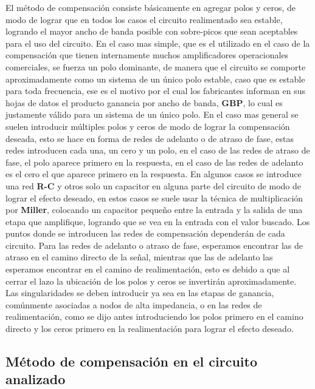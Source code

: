 El método de compensación consiste básicamente en agregar polos y ceros, de modo de lograr que en todos los casos el circuito realimentado sea estable, logrando el mayor ancho de banda posible con sobre-picos que sean aceptables para el uso del circuito. En el caso mas simple, que es el utilizado en el caso de la compensación que tienen internamente muchos amplificadores operacionales comerciales, se fuerza un polo dominante, de manera que el circuito se comporte aproximadamente como un sistema de un único polo estable, caso que es estable para toda frecuencia, ese es el motivo por el cual los fabricantes informan en sus hojas de datos el producto ganancia por ancho de banda, \textbf{GBP}, lo cual es justamente válido para un sistema de un único polo. En el caso mas general se suelen introducir múltiples polos y ceros de modo de lograr la compensación deseada, esto se hace en forma de redes de adelanto o de atraso de fase, estas redes introducen cada una, un cero y un polo, en el caso de las redes de atraso de fase, el polo aparece primero en la respuesta, en el caso de las redes de adelanto es el cero el que aparece primero en la respuesta. En algunos casos se introduce una red \textbf{R-C} y otros solo un capacitor en alguna parte del circuito de modo de lograr el efecto deseado, en estos casos se suele usar la técnica de multiplicación por \textbf{Miller}, colocando un capacitor pequeño entre la entrada y la salida de una etapa que amplifique, logrando que se vea en la entrada con el valor buscado. Los puntos donde se introducen las redes de compensación dependerán de cada circuito. Para las redes de adelanto o atraso de fase, esperamos encontrar las de atraso en el camino directo de la señal, mientras que las de adelanto las esperamos encontrar en el camino de realimentación, esto es debido a que al cerrar el lazo la ubicación de los polos y ceros se invertirán aproximadamente.\\
Las singularidades se deben introducir ya sea en las etapas de ganancia, comúnmente asociadas a nodos de alta impedancia, o en las redes de realimentación, como se dijo antes introduciendo los polos primero en el camino directo y los ceros primero en la realimentación para lograr el efecto deseado.



\subsection{Método de compensación en el circuito analizado}


